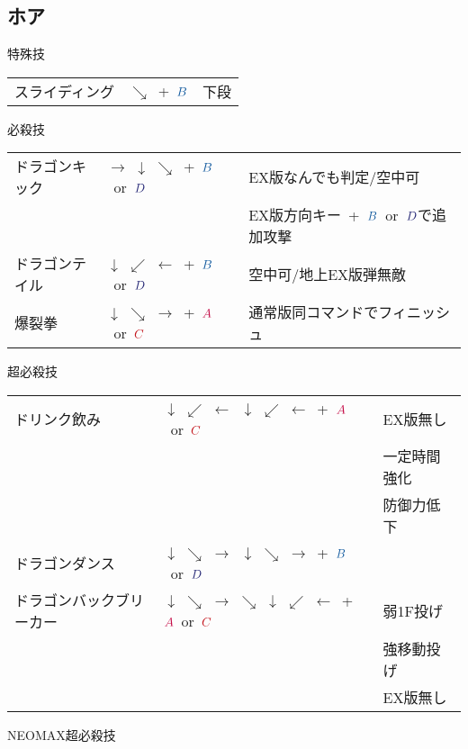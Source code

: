 \documentclass[a4j,11pt]{jarticle}
\def\A{$\textcolor{Acolor}{A}$}
\def\C{$\textcolor{Ccolor}{C}$}
\def\B{$\textcolor{Bcolor}{B}$}
\def\D{$\textcolor{Dcolor}{D}$}
\def\hado{$\downarrow$ $\searrow$ $\rightarrow$}%
\def\tatsu{$\downarrow$ $\swarrow$ $\leftarrow$}%
\def\syoryu{$\rightarrow$ $\downarrow$ $\searrow$}%
\def\ryuko{$\downarrow$ $\searrow$ $\rightarrow$ $\searrow$ $\downarrow$ $\swarrow$ $\leftarrow$}%
\begin{document}
\subsection{ホア}
\begin{itembox}[l]{特殊技}
\begin{tabular}{lll}
スライディング&$\searrow$\ +\ \B&下段%
\end{tabular}
\end{itembox}
\begin{itembox}[l]{必殺技}
\begin{tabular}{lll}
ドラゴンキック&\syoryu\ +\ \B\ or\ \D&EX版なんでも判定/空中可\\%
&&EX版方向キー\ +\ \B\ or\ \D で追加攻撃\\
ドラゴンテイル&\tatsu\ +\ \B\ or\ \D&空中可/地上EX版弾無敵\\%
爆裂拳&\hado\ +\ \A\ or\ \C&通常版同コマンドでフィニッシュ\\%
\end{tabular}
\end{itembox}
\begin{itembox}[l]{超必殺技}
\begin{tabular}{lll}
ドリンク飲み&\tatsu\ \tatsu\ +\ \A\ or\ \C&EX版無し\\
&&一定時間強化\\
&&防御力低下\\%
ドラゴンダンス&\hado\ \hado\ +\ \B\ or\ \D&\\%
ドラゴンバックブリーカー&\ryuko\ +\ \A\ or\ \C&弱1F投げ\\
&&強移動投げ\\%
&&EX版無し
\end{tabular}
\end{itembox}
\begin{itembox}[l]{NEOMAX超必殺技}
\end{itembox}
\newpage
\end{document}

